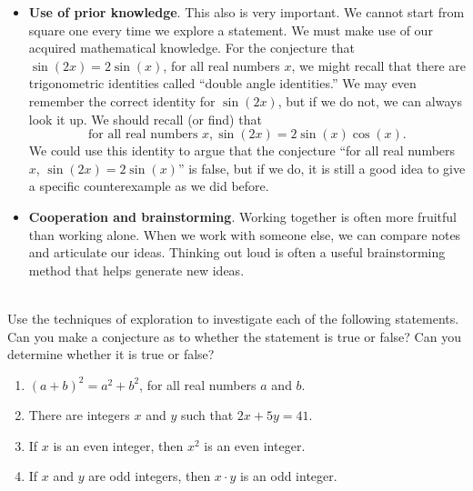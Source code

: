 \begin{itemize}
\item \textbf{Use of prior knowledge}.
This also is very important.  We cannot start from square one every time we explore a statement.  We must make use of our acquired mathematical knowledge.  For the conjecture that 
$\sin\left(2x \right) = 2 \sin (x)$, for all real numbers $x$, we might recall that there are trigonometric identities called ``double angle identities.''  We may even remember the correct identity for $\sin\left( 2x \right)$, but if we do not, we can always look it up.  We should recall (or find) that
\[
\text{for all real numbers } x, \sin \! \left( 2x \right) = 2  \sin (x) \!  \cos (x).
\]
We could use this identity to argue that the conjecture ``for all real numbers $x$, 
$\sin (2x) = 2 \sin(x)$'' is false, but if we do, it is still a good idea to give a specific counterexample as we did before.

\item \textbf{Cooperation and brainstorming}.
Working together is often more fruitful than working alone.  When we work with someone else, we can compare notes and articulate our ideas.  Thinking out loud is often a useful brainstorming method that helps generate new ideas.
\end{itemize}

\begin{prog}\label{pr:explores} \hfill \\
Use the techniques of exploration to investigate each of the following statements.  Can you make a conjecture as to whether the statement is true or false?  Can you determine whether it is true or false?
\begin{enumerate}
  \item $\left(a+b \right)^2=a^2+b^2$, for all real numbers  $a$  and  $b$.
  \item There are integers  $x$  and  $y$  such that $2x+5y=41$.
  \item If  $x$  is an even integer, then $x^2$  is an even integer.
  \item If $x$ and $y$ are odd integers, then $x \cdot y$ is an odd integer.
\end{enumerate}
\end{prog}
\hbreak
